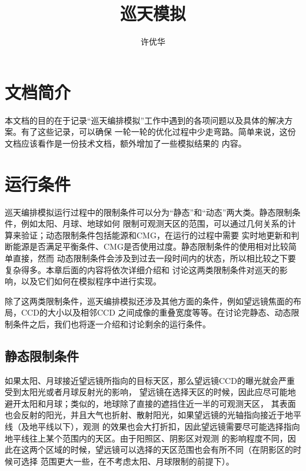 \documentclass[a4paper,11pt]{ctexart}
\def\blankpage{%
      \clearpage%
      \thispagestyle{empty}%
      \addtocounter{page}{-1}%
      \null%
      \clearpage}
\begin{document}
\title{巡天模拟}
\author{许优华}

\maketitle



\newpage
\tableofcontents


\section{文档简介}
本文档的目的在于记录“巡天编排模拟”工作中遇到的各项问题以及具体的解决方案。有了这些记录，可以确保
一轮一轮的优化过程中少走弯路。简单来说，这份文档应该看作是一份技术文档，额外增加了一些模拟结果的
内容。

\blankpage

\section{运行条件}

巡天编排模拟运行过程中的限制条件可以分为“静态”和“动态”两大类。静态限制条件，例如太阳、月球、地球如何
限制可观测天区的范围，可以通过几何关系的计算来验证；动态限制条件包括能源和CMG，在运行的过程中需要
实时地更新和判断能源是否满足平衡条件、CMG是否使用过度。静态限制条件的使用相对比较简单直接，然而
动态限制条件会涉及到过去一段时间内的状态，所以相比较之下要复杂得多。本章后面的内容将依次详细介绍和
讨论这两类限制条件对巡天的影响，以及它们如何在模拟程序中进行实现。

除了这两类限制条件，巡天编排模拟还涉及其他方面的条件，例如望远镜焦面的布局，CCD的大小以及相邻CCD
之间成像的重叠宽度等等。在讨论完静态、动态限制条件之后，我们也将逐一介绍和讨论剩余的运行条件。

\subsection{静态限制条件}
如果太阳、月球接近望远镜所指向的目标天区，那么望远镜CCD的曝光就会严重受到太阳光或者月球反射光的影响，
望远镜在选择天区的时候，因此应尽可能地避开太阳和月球；类似的，地球除了直接的遮挡住近一半的可观测天区，
其表面也会反射的阳光，并且大气也折射、散射阳光，如果望远镜的光轴指向接近于地平线（及地平线以下），观测
的效果也会大打折扣，因此望远镜需要尽可能选择指向地平线往上某个范围内的天区。由于阳照区、阴影区对观测
的影响程度不同，因此在这两个区域的时候，望远镜可以选择的天区范围也会有所不同（在阴影区的时候可选择
范围更大一些，在不考虑太阳、月球限制的前提下）。
\end{document}
